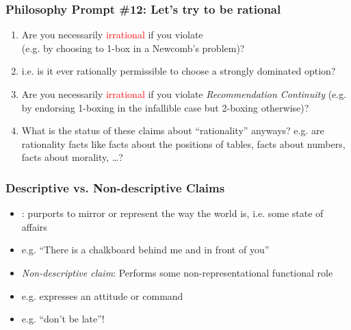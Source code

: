 \begin{frame}
\frametitle{Philosophy Prompt \#12: Let's try to be rational}

\begin{enumerate}[<+->]

\item Are you necessarily \textcolor{red}{irrational} if you violate  \\ (e.g. by choosing to 1-box in a Newcomb's problem)?
\item[] i.e. is it ever rationally permissible to choose a strongly dominated option? 

\item Are you necessarily \textcolor{red}{irrational} if you violate \emph{Recommendation Continuity} (e.g. by endorsing 1-boxing in the infallible case but 2-boxing otherwise)?

\item What is the status of these claims about ``rationality'' anyways? e.g. are rationality facts like facts about the positions of tables, facts about numbers, facts about morality, \dots?

\end{enumerate}
\end{frame}

\begin{frame}
\frametitle{Descriptive vs. Non-descriptive Claims}

\begin{itemize}[<+->]

\item {}: purports to mirror or represent the way the world is, i.e. some state of affairs

\item[] e.g. ``There is a chalkboard behind me and in front of you''

\item \emph{Non-descriptive claim}: Performs some non-representational functional role

\item[] e.g. expresses an attitude or command

\item[] e.g. ``don't be late''! 

\end{itemize}
\end{frame}


